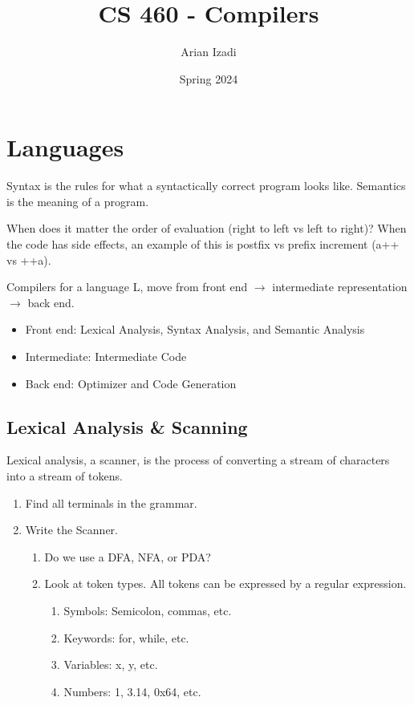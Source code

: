 \documentclass[twocolumn]{article}
\title{CS 460 {-} Compilers}
\author{Arian Izadi}
\date{Spring 2024}
\begin{document}
\maketitle

\section{Languages}

Syntax is the rules for what a syntactically correct program looks like.
Semantics is the meaning of a program.

When does it matter the order of evaluation (right to left vs left to right)?
When the code has side effects, an example of this is postfix vs prefix increment (a++ vs ++a).

Compilers for a language L, move from front end $\to$ intermediate representation $\to$ back end.

\begin{itemize}
  \item Front end: Lexical Analysis, Syntax Analysis, and Semantic Analysis
  \item Intermediate: Intermediate Code
  \item Back end: Optimizer and Code Generation
\end{itemize}

\subsection{Lexical Analysis \& Scanning}

Lexical analysis, a scanner, is the process of converting a stream of characters into a stream of tokens.

\begin{enumerate}
  \item Find all terminals in the grammar.
  \item Write the Scanner.
        \begin{enumerate}
          \item Do we use a DFA, NFA, or PDA{?}
          \item Look at token types. All tokens can be expressed by a regular expression.
                \begin{enumerate}
                  \item Symbols: Semicolon, commas, etc.
                  \item Keywords: for, while, etc.
                  \item Variables: x, y, etc.
                  \item Numbers: 1, 3.14, 0{x}64, etc.
                \end{enumerate}
        \end{enumerate}
\end{enumerate}
\end{document}
